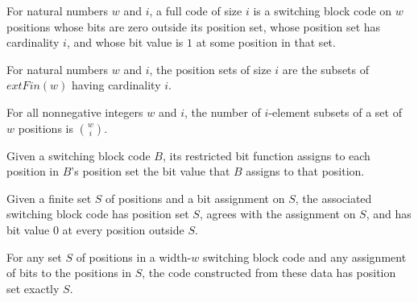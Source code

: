 \begin{definition}
\label{FABL.SwitchingBlockCode.FullOfSize}
\leanok
{}
For natural numbers $w$ and $i$, a full code of size $i$ is a switching block code on
$w$ positions whose bits are zero outside its position set, whose position set has
cardinality $i$, and whose bit value is $1$ at some position in that set.
\end{definition}

\begin{definition}
\label{FABL.SwitchingBlockCode.PositionSet}
\leanok
For natural numbers $w$ and $i$, the position sets of size $i$ are the subsets of
$	ext{Fin}(w)$ having cardinality $i$.
\end{definition}

\begin{theorem}
\label{FABL.SwitchingBlockCode.card_positionSet}
\leanok
{}
For all nonnegative integers $w$ and $i$, the number of $i$-element subsets of a set of
$w$ positions is $\binom{w}{i}$.
\end{theorem}

\begin{definition}
\label{FABL.SwitchingBlockCode.restrictBits}
\leanok
{}
Given a switching block code $B$, its restricted bit function assigns to each position
in $B$’s position set the bit value that $B$ assigns to that position.
\end{definition}

\begin{definition}
\label{FABL.SwitchingBlockCode.ofPositionBits}
\leanok
{}
Given a finite set $S$ of positions and a bit assignment on $S$, the associated
switching block code has position set $S$, agrees with the assignment on $S$, and has
bit value $0$ at every position outside $S$.
\end{definition}

\begin{theorem}
\label{FABL.SwitchingBlockCode.ofPositionBits_positions}
\leanok
{}
For any set $S$ of positions in a width-$w$ switching block code and any assignment of
bits to the positions in $S$, the code constructed from these data has position set
exactly $S$.
\end{theorem}

